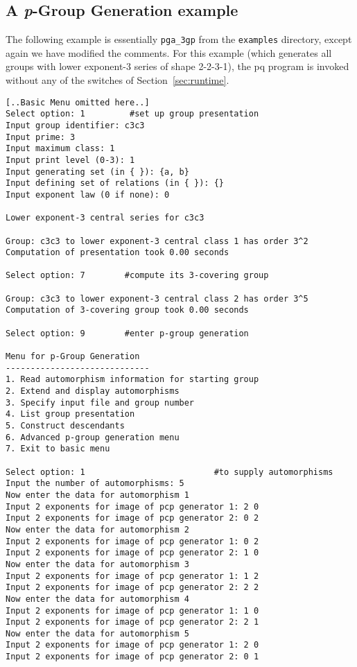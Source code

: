 \documentclass[12pt]{article}
\begin{document}
\subsection{A {\it p}-Group Generation example}

The following example is essentially \verb|pga_3gp| from the
\texttt{examples} directory, except again we have modified the comments.
For this example (which generates all groups with lower exponent-3 series of
shape 2-2-3-1), the pq program is invoked without any of the switches
of Section~\ref{sec:runtime}.

\begin{verbatim}
[..Basic Menu omitted here..]
Select option: 1         #set up group presentation
Input group identifier: c3c3
Input prime: 3
Input maximum class: 1
Input print level (0-3): 1
Input generating set (in { }): {a, b}
Input defining set of relations (in { }): {}
Input exponent law (0 if none): 0

Lower exponent-3 central series for c3c3

Group: c3c3 to lower exponent-3 central class 1 has order 3^2
Computation of presentation took 0.00 seconds

Select option: 7        #compute its 3-covering group 

Group: c3c3 to lower exponent-3 central class 2 has order 3^5
Computation of 3-covering group took 0.00 seconds

Select option: 9        #enter p-group generation 

Menu for p-Group Generation
-----------------------------
1. Read automorphism information for starting group
2. Extend and display automorphisms
3. Specify input file and group number
4. List group presentation
5. Construct descendants
6. Advanced p-group generation menu
7. Exit to basic menu

Select option: 1                          #to supply automorphisms 
Input the number of automorphisms: 5
Now enter the data for automorphism 1
Input 2 exponents for image of pcp generator 1: 2 0
Input 2 exponents for image of pcp generator 2: 0 2
Now enter the data for automorphism 2
Input 2 exponents for image of pcp generator 1: 0 2
Input 2 exponents for image of pcp generator 2: 1 0
Now enter the data for automorphism 3
Input 2 exponents for image of pcp generator 1: 1 2
Input 2 exponents for image of pcp generator 2: 2 2 
Now enter the data for automorphism 4
Input 2 exponents for image of pcp generator 1: 1 0
Input 2 exponents for image of pcp generator 2: 2 1
Now enter the data for automorphism 5
Input 2 exponents for image of pcp generator 1: 2 0
Input 2 exponents for image of pcp generator 2: 0 1


\end{verbatim}
\end{document}
